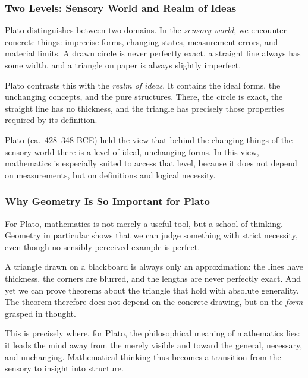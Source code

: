 \subsubsection*{Two Levels: Sensory World and Realm of Ideas}

Plato distinguishes between two domains.
In the \emph{sensory world}, we encounter concrete things:
imprecise forms,
changing states,
measurement errors, and material limits.
A drawn circle is never perfectly exact,
a straight line always has some width,
and a triangle on paper is always slightly imperfect.

Plato contrasts this with the \emph{realm of ideas}.
It contains the ideal forms,
the unchanging concepts,
and the pure structures.
There, the circle is exact,
the straight line has no thickness,
and the triangle has precisely those properties
required by its definition.

\begin{HistoryBox}
	\label{box:plato-realm-of-ideas}
	\small
	Plato (ca.\ 428--348 BCE) held the view
	that behind the changing things of the sensory world
	there is a level of ideal,
	unchanging forms.
	In this view, mathematics is especially suited to access that level,
	because it does not depend on measurements,
	but on definitions and logical necessity.
\end{HistoryBox}

\subsubsection*{Why Geometry Is So Important for Plato}

For Plato, mathematics is not merely a useful tool,
but a school of thinking.
Geometry in particular shows
that we can judge something with strict necessity,
even though no sensibly perceived example is perfect.

A triangle drawn on a blackboard is always only an approximation:
the lines have thickness,
the corners are blurred,
and the lengths are never perfectly exact.
And yet we can prove theorems about the triangle
that hold with absolute generality.
The theorem therefore does not depend on the concrete drawing,
but on the \emph{form}
grasped in thought.

This is precisely where, for Plato,
the philosophical meaning of mathematics lies:
it leads the mind away from the merely visible
and toward the general,
necessary, and unchanging.
Mathematical thinking thus becomes a transition
from the sensory to insight into structure.


